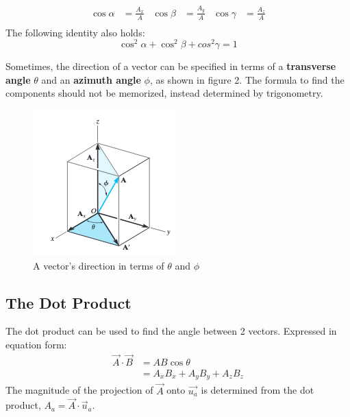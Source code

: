 \documentclass[12pt]{article}
\begin{document}
\begin{align*}
    \cos{\alpha} &= \frac{A_x}{A} & \cos{\beta} &= \frac{A_y}{A} & \cos{\gamma} &= \frac{A_z}{A} \\
\end{align*}
The following identity also holds:
\begin{equation*}
    \cos^2{\alpha} + \cos^2{\beta} + cos^2{\gamma} = 1
\end{equation*}

Sometimes, the direction of a vector can be specified in terms of a \textbf{transverse angle} $\theta$ and an \textbf{azimuth angle} $\phi$, as shown in figure 2.
The formula to find the components should not be memorized, instead determined by trigonometry.

\begin{figure}[h]
\centering
\includegraphics[scale=0.7]{transverse_azmuth.png}
\caption{A vector's direction in terms of $\theta$ and $\phi$ \cite{hibbeler}}
\end{figure}
\pagebreak

\subsection{The Dot Product}
The dot product can be used to find the angle between 2 vectors.
Expressed in equation form:
\begin{align*}
    \vec{A}\cdot\vec{B} &= AB\cos{\theta}\\
                        &= A_xB_x + A_yB_y + A_zB_z
\end{align*}
The magnitude of the projection of $\vec{A}$ onto $\vec{u_a}$ is determined from the dot product, $A_a = \vec{A}\cdot\vec{u}_a$.
\end{document}

